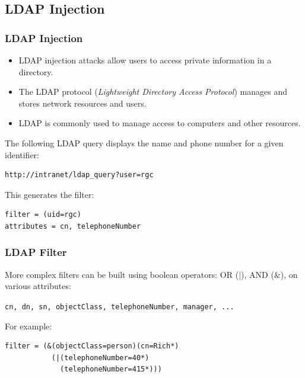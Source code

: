 \documentclass{beamer}
\def\emptyline{\vspace{10pt}}
\begin{document}
\subsection{LDAP Injection}

\begin{frame}[fragile]
\frametitle{LDAP Injection}

\begin{itemize}
\item LDAP injection attacks allow users to access private information in a directory.
\item The LDAP protocol (\textit{Lightweight Directory Access Protocol}) manages and stores network resources and users.
\item LDAP is commonly used to manage access to computers and other resources.
\end{itemize}

\emptyline
The following LDAP query displays the name and phone number for a given identifier:
\begin{verbatim}
http://intranet/ldap_query?user=rgc
\end{verbatim}
This generates the filter:
\begin{verbatim}
filter = (uid=rgc)
attributes = cn, telephoneNumber
\end{verbatim}
\end{frame}


\begin{frame}[fragile]
\frametitle{LDAP Filter}

More complex filters can be built using boolean operators: OR ($|$), AND ($\&$), on various attributes:
\begin{center}
\texttt{cn, dn, sn, objectClass, telephoneNumber, manager, ...}
\end{center}

For example:
\begin{verbatim}
filter = (&(objectClass=person)(cn=Rich*)
           (|(telephoneNumber=40*)
             (telephoneNumber=415*)))
\end{verbatim}
\end{frame}
\end{document}
